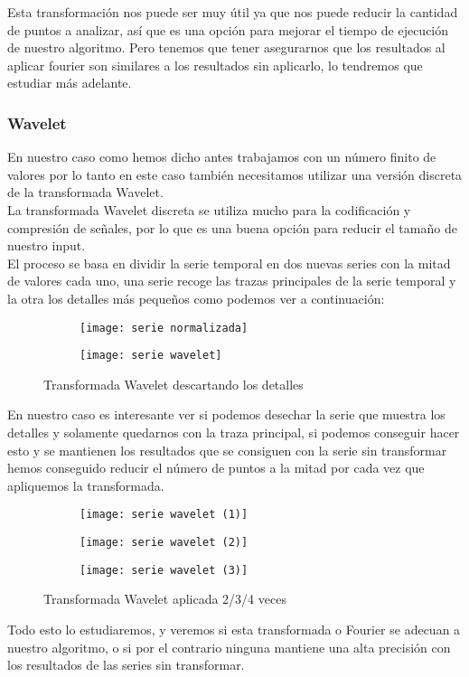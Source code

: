 \documentclass[12pt,a4paper]{article}
\begin{document}
			Esta transformación nos puede ser muy útil ya que nos puede reducir la cantidad de puntos a analizar, así que es una opción para mejorar el tiempo de ejecución de nuestro algoritmo. Pero tenemos que tener asegurarnos que los resultados al aplicar fourier son similares a los resultados sin aplicarlo, lo tendremos que estudiar más adelante.
			
			\subsubsection{Wavelet}
			En nuestro caso como hemos dicho antes trabajamos con un número finito de valores por lo tanto en este caso también necesitamos utilizar una versión discreta de la transformada Wavelet.\\
			La transformada Wavelet discreta  se utiliza mucho para la codificación y compresión de señales, por lo que es una buena opción para reducir el tamaño de nuestro input.\\
			El proceso se basa en dividir la serie temporal en dos nuevas series con la mitad de valores cada uno, una serie recoge las trazas principales de la serie temporal y la otra los detalles más pequeños como podemos ver a continuación:\\
\begin{figure}[H]
\centering
\begin{subfigure}{.5\textwidth}
  \centering
  \texttt{[image: serie normalizada]}
  \label{fig:sub1}
\end{subfigure}%
\begin{subfigure}{.5\textwidth}
  \centering
  \texttt{[image: serie wavelet]}
  \label{fig:sub2}
\end{subfigure}
\caption{Transformada Wavelet descartando los detalles}
\label{fig:test}
\end{figure}
			En nuestro caso es interesante ver si podemos desechar la serie que muestra los detalles y solamente quedarnos con la traza principal, si podemos conseguir hacer esto y se mantienen los resultados que se consiguen con la serie sin transformar hemos conseguido reducir el número de puntos a la mitad por cada vez que apliquemos la transformada.\\
\begin{figure}[H]
\centering
\begin{subfigure}{.3\textwidth}
  \centering
  \texttt{[image: serie wavelet (1)]}
  \label{fig:sub1}
\end{subfigure}%
\begin{subfigure}{.3\textwidth}
  \centering
  \texttt{[image: serie wavelet (2)]}
  \label{fig:sub1}
\end{subfigure}%
\begin{subfigure}{.3\textwidth}
  \centering
  \texttt{[image: serie wavelet (3)]}
  \label{fig:sub2}
\end{subfigure}
\caption{Transformada Wavelet aplicada 2/3/4 veces}
\label{fig:test}
\end{figure}
			Todo esto lo estudiaremos, y veremos si esta transformada o Fourier se adecuan a nuestro algoritmo, o si por el contrario ninguna mantiene una alta precisión con los resultados de las series sin transformar.
\end{document}
